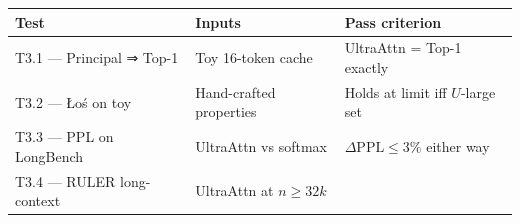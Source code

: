 \documentclass[
  11pt,
]{article}
\begin{document}
\begin{longtable}[]{@{}lll@{}}
\toprule
\begin{minipage}[b]{0.18\columnwidth}\raggedright
Test\strut
\end{minipage} & \begin{minipage}[b]{0.24\columnwidth}\raggedright
Inputs\strut
\end{minipage} & \begin{minipage}[b]{0.49\columnwidth}\raggedright
Pass criterion\strut
\end{minipage}\tabularnewline
\midrule
\endhead
\begin{minipage}[t]{0.18\columnwidth}\raggedright
T3.1 --- Principal ⇒ Top-1\strut
\end{minipage} & \begin{minipage}[t]{0.24\columnwidth}\raggedright
Toy 16-token cache\strut
\end{minipage} & \begin{minipage}[t]{0.49\columnwidth}\raggedright
UltraAttn = Top-1 exactly\strut
\end{minipage}\tabularnewline
\begin{minipage}[t]{0.18\columnwidth}\raggedright
T3.2 --- Łoś on toy\strut
\end{minipage} & \begin{minipage}[t]{0.24\columnwidth}\raggedright
Hand-crafted properties\strut
\end{minipage} & \begin{minipage}[t]{0.49\columnwidth}\raggedright
Holds at limit iff \(U\)-large set\strut
\end{minipage}\tabularnewline
\begin{minipage}[t]{0.18\columnwidth}\raggedright
T3.3 --- PPL on LongBench\strut
\end{minipage} & \begin{minipage}[t]{0.24\columnwidth}\raggedright
UltraAttn vs softmax\strut
\end{minipage} & \begin{minipage}[t]{0.49\columnwidth}\raggedright
\(\Delta\text{PPL} \le 3\%\) either way\strut
\end{minipage}\tabularnewline
\begin{minipage}[t]{0.18\columnwidth}\raggedright
T3.4 --- RULER long-context\strut
\end{minipage} & \begin{minipage}[t]{0.24\columnwidth}\raggedright
UltraAttn at \(n \ge 32k\)\strut
\end{minipage} & \begin{minipage}[t]{0.49\columnwidth}\raggedright

\end{minipage}
\end{longtable}
\end{document}
